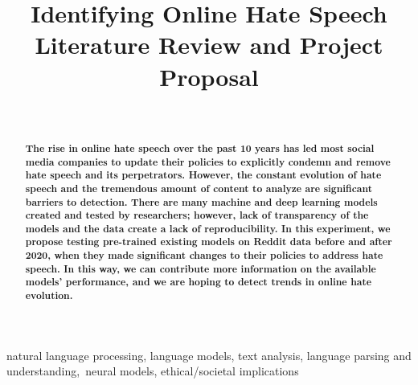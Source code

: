 \documentclass[conference]{IEEEtran}
\begin{document}
\title{Identifying Online Hate Speech \\
Literature Review and Project Proposal\\
}

\author{
\and
{}
\and
{}
\
}

\maketitle


\begin{abstract}
\textbf{The rise in online hate speech over the past 10 years has led most social media companies to update their policies to explicitly condemn and remove hate speech and its perpetrators. However, the constant evolution of hate speech and the tremendous amount of content to analyze are significant barriers to detection. There are many machine and deep learning models created and tested by researchers; however, lack of transparency of the models and the data create a lack of reproducibility. In this experiment, we propose testing pre-trained existing models on Reddit data before and after 2020, when they made significant changes to their policies to address hate speech. In this way, we can contribute more information on the available models' performance, and we are hoping to detect trends in online hate evolution.}
\end{abstract}

\begin{IEEEkeywords}
natural language processing, language models, text analysis, language parsing and understanding,\
neural models, ethical/societal implications
\end{IEEEkeywords}
\end{document}

